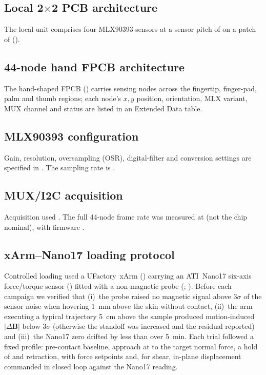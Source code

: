 \subsection*{Local 2$\times$2 PCB architecture}
The local unit comprises four MLX90393 sensors at a sensor pitch of
 on a patch of 
().

\subsection*{44-node hand FPCB architecture}
The hand-shaped FPCB () carries sensing
nodes across the fingertip, finger-pad, palm and thumb regions; each node's
$x,y$ position, orientation, MLX variant, MUX channel and status are listed
in an Extended Data table.

\subsection*{MLX90393 configuration}
Gain, resolution, oversampling (OSR), digital-filter and conversion settings
are specified in . The sampling rate is
.

\subsection*{MUX/I2C acquisition}
Acquisition used . The full
44-node frame rate was measured at  (not the chip nominal),
with firmware .

\subsection*{xArm--Nano17 loading protocol}
Controlled loading used a UFactory~xArm () carrying an
ATI~Nano17 six-axis force/torque sensor ()
fitted with a non-magnetic probe (;
). Before each campaign we
verified that (i)~the probe raised no magnetic signal above $3\sigma$ of the
sensor noise when hovering 1~mm above the skin without contact, (ii)~the arm
executing a typical trajectory 5~cm above the sample produced motion-induced
$|\Delta\mathbf{B}|$ below $3\sigma$ (otherwise the standoff was increased
and the residual reported) and (iii)~the Nano17 zero drifted by less than
 over 5~min. Each trial followed a fixed profile: pre-contact
baseline, approach at  to the target
normal force, a hold of  and retraction, with
force setpoints and, for shear, in-plane displacement commanded in closed
loop against the Nano17 reading.

